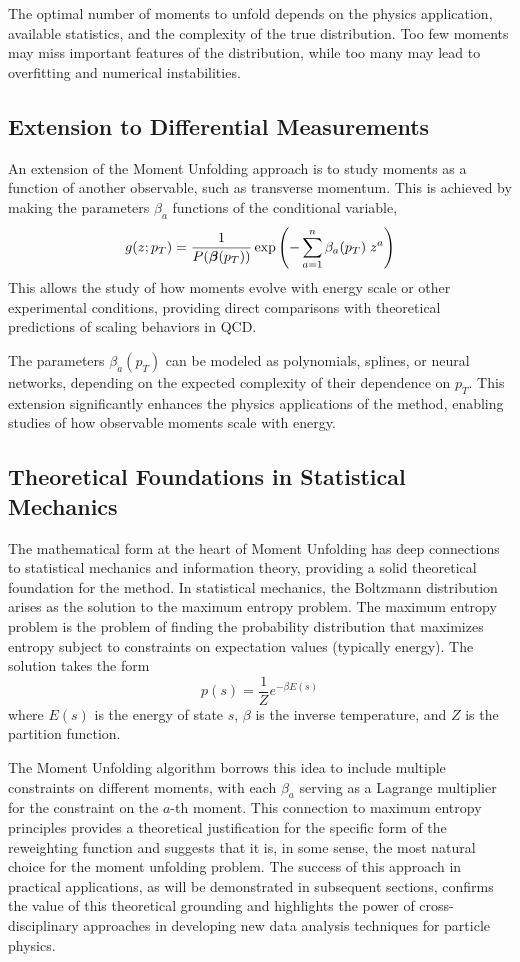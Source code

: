         The optimal number of moments to unfold depends on the physics application, available statistics, and the complexity of the true distribution.
        Too few moments may miss important features of the distribution, while too many may lead to overfitting and numerical instabilities.
    \subsection{Extension to Differential Measurements}
        An extension of the Moment Unfolding approach is to study moments as a function of another observable, such as transverse momentum.
        This is achieved by making the parameters $\beta_a$ functions of the conditional variable,
        \[
            \label{eq:pt-moment-gen}
            g(z; p_T) = \frac{1}{P\qty(\vb*{\beta}\qty(p_T))} \exp\left(-\sum_{a=1}^n \beta_a(p_T)\; z^a\right)
        \]
        This allows the study of how moments evolve with energy scale or other experimental conditions, providing direct comparisons with theoretical predictions of scaling behaviors in QCD.

        The parameters $\beta_a(p_T)$ can be modeled as polynomials, splines, or neural networks, depending on the expected complexity of their dependence on $p_T$.
        This extension significantly enhances the physics applications of the method, enabling studies of how observable moments scale with energy.

    \subsection{Theoretical Foundations in Statistical Mechanics}
        The mathematical form at the heart of Moment Unfolding has deep connections to statistical mechanics and information theory, providing a solid theoretical foundation for the method.
        In statistical mechanics, the Boltzmann distribution arises as the solution to the maximum entropy problem.
        The maximum entropy problem is the problem of finding the probability distribution that maximizes entropy subject to constraints on expectation values (typically energy).
        The solution takes the form
        \[
            p(s) = \frac{1}{Z} e^{-\beta E(s)}
        \]
        where $E(s)$ is the energy of state $s$, $\beta$ is the inverse temperature, and $Z$ is the partition function.

        The Moment Unfolding algorithm borrows this idea to include multiple constraints on different moments, with each $\beta_a$ serving as a Lagrange multiplier for the constraint on the $a$-th moment.
        This connection to maximum entropy principles provides a theoretical justification for the specific form of the reweighting function and suggests that it is, in some sense, the most natural choice for the moment unfolding problem.
        The success of this approach in practical applications, as will be demonstrated in subsequent sections, confirms the value of this theoretical grounding and highlights the power of cross-disciplinary approaches in developing new data analysis techniques for particle physics.
